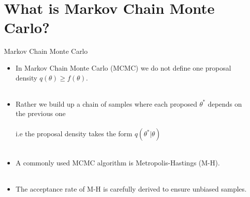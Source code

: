 \documentclass[compress]{beamer}
\begin{document}
\section{What is Markov Chain Monte Carlo?}
\label{sec-7}
\begin{frame}[label=sec-7-1]{Markov Chain Monte Carlo}
\begin{itemize}
\item In Markov Chain Monte Carlo (MCMC) we do not define one proposal density $q(\theta) \geqslant f(\theta)$.\\~\\
\item Rather we build up a \alert{chain} of samples where each proposed $\theta^*$ depends on the previous one \\~\\
 i.e the proposal density takes the form $q(\theta^* | \theta)$\\~\\
\item A commonly used MCMC algorithm is \alert{Metropolis-Hastings} (M-H).\\~\\
\item The acceptance rate of M-H is carefully derived to ensure \alert{unbiased samples}.
\end{itemize}
\end{frame}
\end{document}
